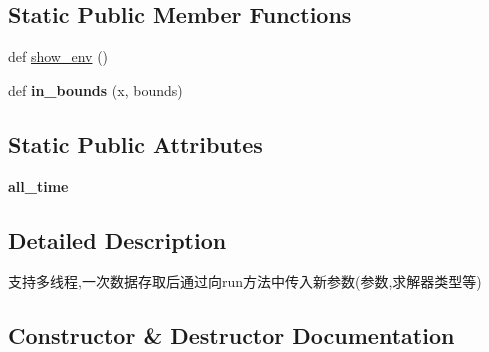 \subsection*{Static Public Member Functions}
\begin{DoxyCompactItemize}
\item 
def \hyperlink{classMIS_1_1Muon__Imaging__Algorithm_1_1InvSolver_1_1Solver_1_1Solver_a1bec85516ff8ccfced71fbcfa8a530a7}{show\+\_\+env} ()
\item 
\mbox{\label{classMIS_1_1Muon__Imaging__Algorithm_1_1InvSolver_1_1Solver_1_1Solver_aa9f066a68023ee779d9ef969991e0448}} 
def {\bfseries in\+\_\+bounds} (x, bounds)
\end{DoxyCompactItemize}
\subsection*{Static Public Attributes}
\begin{DoxyCompactItemize}
\item 
\mbox{\label{classMIS_1_1Muon__Imaging__Algorithm_1_1InvSolver_1_1Solver_1_1Solver_a06e82a464cb8a0138c711a06a9b16b73}} 
{\bfseries all\+\_\+time}
\end{DoxyCompactItemize}


\subsection{Detailed Description}
\begin{DoxyVerb}支持多线程,一次数据存取后通过向run方法中传入新参数(参数,求解器类型等)
\end{DoxyVerb}
 

\subsection{Constructor \& Destructor Documentation}
\mbox{\label{classMIS_1_1Muon__Imaging__Algorithm_1_1InvSolver_1_1Solver_1_1Solver_a1506124c55af1fe081fa3351ea67d057}} 
